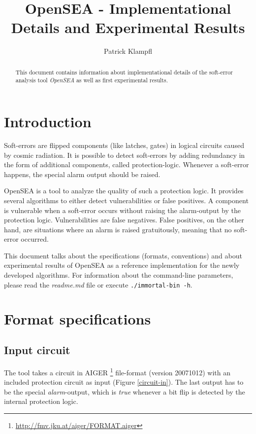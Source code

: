 \documentclass[a4paper,10pt]{article}
\title{OpenSEA - Implementational Details and Experimental Results}
\author{Patrick Klampfl}
\begin{document}
\maketitle

\begin{abstract}
This document contains information about implementational details of the soft-error analysis tool \emph{OpenSEA} as well as first experimental results.
\end{abstract}

\section{Introduction}
Soft-errors are flipped components (like latches, gates) in logical circuits caused by cosmic radiation. It is possible to detect soft-errors by adding redundancy in the form of
additional components, called protection-logic. Whenever a soft-error happens, the special alarm output should be raised.

OpenSEA is a tool to analyze the quality of such a protection logic. It provides several algorithms to either detect vulnerabilities or false positives.
A component is vulnerable when a soft-error occurs without raising the alarm-output by the protection logic. Vulnerabilities are false negatives.
False positives, on the other hand, are situations where an alarm is raised gratuitously, meaning that no soft-error occurred.

This document talks about the specifications (formats, conventions) and about experimental results of OpenSEA as a reference implementation for the newly developed algorithms. 
For information about the command-line parameters, please read the \emph{readme.md} file or execute \texttt{./immortal-bin -h}.

\section{Format specifications}
\subsection{Input circuit}
The tool takes a circuit in AIGER \footnote{\url{http://fmv.jku.at/aiger/FORMAT.aiger}} file-format (version 20071012) with an included protection circuit as input (Figure \ref{circuit-in}). The last output has to be the 
special \emph{alarm}-output, which is \emph{true} whenever a bit flip is detected by the internal protection logic.
\end{document}
